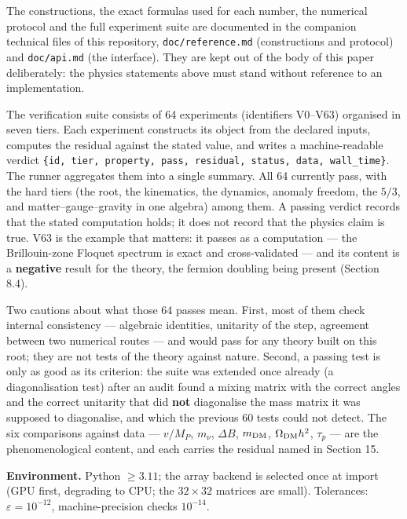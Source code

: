 \documentclass[aps,prd,amsmath,amssymb,superscriptaddress,longbibliography,floatfix,preprint]{revtex4-2}
\begin{document}
The constructions, the exact formulas used for each number, the numerical protocol and the full experiment suite are documented in the companion technical files of this repository, \texttt{doc/\allowbreak{}reference.md} (constructions and protocol) and \texttt{doc/\allowbreak{}api.md} (the interface). They are kept out of the body of this paper deliberately: the physics statements above must stand without reference to an implementation.

The verification suite consists of 64 experiments (identifiers V0--V63) organised in seven tiers. Each experiment constructs its object from the declared inputs, computes the residual against the stated value, and writes a machine-readable verdict \texttt{\{id, tier, property, pass, residual, status, data, wall\_\allowbreak{}time\}}. The runner aggregates them into a single summary. All 64 currently pass, with the hard tiers (the root, the kinematics, the dynamics, anomaly freedom, the $5/3$, and matter--gauge--gravity in one algebra) among them. A passing verdict records that the stated computation holds; it does not record that the physics claim is true. V63 is the example that matters: it passes as a computation --- the Brillouin-zone Floquet spectrum is exact and cross-validated --- and its content is a \textbf{negative} result for the theory, the fermion doubling being present (Section 8.4).

Two cautions about what those 64 passes mean. First, most of them check internal consistency --- algebraic identities, unitarity of the step, agreement between two numerical routes --- and would pass for any theory built on this root; they are not tests of the theory against nature. Second, a passing test is only as good as its criterion: the suite was extended once already (a diagonalisation test) after an audit found a mixing matrix with the correct angles and the correct unitarity that did \textbf{not} diagonalise the mass matrix it was supposed to diagonalise, and which the previous 60 tests could not detect. The six comparisons against data --- $v/M_P$, $m_\nu$, $\Delta B$, $m_{\rm DM}$, $\Omega_{\rm DM}h^2$, $\tau_p$ --- are the phenomenological content, and each carries the residual named in Section 15.

\textbf{Environment.} Python $\ge 3.11$; the array backend is selected once at import (GPU first, degrading to CPU; the $32\times32$ matrices are small). Tolerances: $\varepsilon = 10^{-12}$, machine-precision checks $10^{-14}$.
\end{document}
